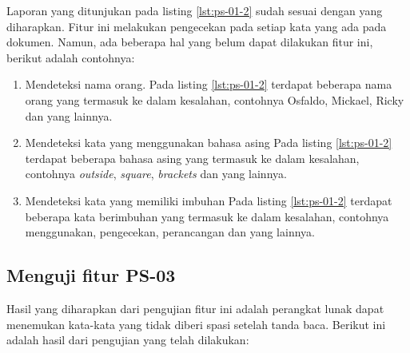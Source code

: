 Laporan yang ditunjukan pada listing \ref{lst:ps-01-2} sudah sesuai dengan yang diharapkan. Fitur ini melakukan pengecekan pada setiap kata yang ada pada dokumen. Namun, ada beberapa hal yang belum dapat dilakukan fitur ini, berikut adalah contohnya:

\begin{enumerate}
	\item Mendeteksi nama orang. \newline
	Pada listing \ref{lst:ps-01-2} terdapat beberapa nama orang yang termasuk ke dalam kesalahan, contohnya Osfaldo, Mickael, Ricky dan yang lainnya.
	
	\item Mendeteksi kata yang menggunakan bahasa asing \newline
	Pada listing \ref{lst:ps-01-2} terdapat beberapa bahasa asing yang termasuk ke dalam kesalahan, contohnya \textit{outside}, \textit{square}, \textit{brackets} dan yang lainnya.
	
	\item Mendeteksi kata yang memiliki imbuhan \newline
	Pada listing \ref{lst:ps-01-2} terdapat beberapa kata berimbuhan yang termasuk ke dalam kesalahan, contohnya menggunakan, pengecekan, perancangan dan yang lainnya.
\end{enumerate}

\subsection{Menguji fitur PS-03}
Hasil yang diharapkan dari pengujian fitur ini adalah perangkat lunak dapat menemukan kata-kata yang tidak diberi spasi setelah tanda baca. Berikut ini adalah hasil dari pengujian yang telah dilakukan:

